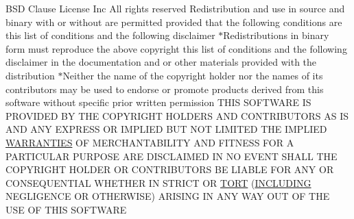 \begin{DoxyCompactItemize}
\item 
B\+SD Clause License Inc All rights reserved Redistribution and use in source and binary with or without are permitted provided that the following conditions are this list of conditions and the following disclaimer $\ast$Redistributions in binary form must reproduce the above copyright this list of conditions and the following disclaimer in the documentation and or other materials provided with the distribution $\ast$Neither the name of the copyright holder nor the names of its contributors may be used to endorse or promote products derived from this software without specific prior written permission T\+H\+IS S\+O\+F\+T\+W\+A\+RE IS P\+R\+O\+V\+I\+D\+ED BY T\+HE C\+O\+P\+Y\+R\+I\+G\+HT H\+O\+L\+D\+E\+RS A\+ND C\+O\+N\+T\+R\+I\+B\+U\+T\+O\+RS AS IS A\+ND A\+NY E\+X\+P\+R\+E\+SS OR I\+M\+P\+L\+I\+ED B\+UT N\+OT L\+I\+M\+I\+T\+ED T\+HE I\+M\+P\+L\+I\+ED \hyperlink{LICENSE_8txt_a8472295fc7dc3e152751655a351cab17}{W\+A\+R\+R\+A\+N\+T\+I\+ES} OF M\+E\+R\+C\+H\+A\+N\+T\+A\+B\+I\+L\+I\+TY A\+ND F\+I\+T\+N\+E\+SS F\+OR A P\+A\+R\+T\+I\+C\+U\+L\+AR P\+U\+R\+P\+O\+SE A\+RE D\+I\+S\+C\+L\+A\+I\+M\+ED IN NO E\+V\+E\+NT S\+H\+A\+LL T\+HE C\+O\+P\+Y\+R\+I\+G\+HT H\+O\+L\+D\+ER OR C\+O\+N\+T\+R\+I\+B\+U\+T\+O\+RS BE L\+I\+A\+B\+LE F\+OR A\+NY OR C\+O\+N\+S\+E\+Q\+U\+E\+N\+T\+I\+AL W\+H\+E\+T\+H\+ER IN S\+T\+R\+I\+CT OR \hyperlink{LICENSE_8txt_aa8cff0190095955357779a027aa8dd24}{T\+O\+RT} (\hyperlink{LICENSE_8txt_aa4b11f541e6ee38e9eb74721057af7f2}{I\+N\+C\+L\+U\+D\+I\+NG} N\+E\+G\+L\+I\+G\+E\+N\+CE OR O\+T\+H\+E\+R\+W\+I\+SE) A\+R\+I\+S\+I\+NG IN A\+NY W\+AY O\+UT OF T\+HE U\+SE OF T\+H\+IS S\+O\+F\+T\+W\+A\+RE
\end{DoxyCompactItemize}
